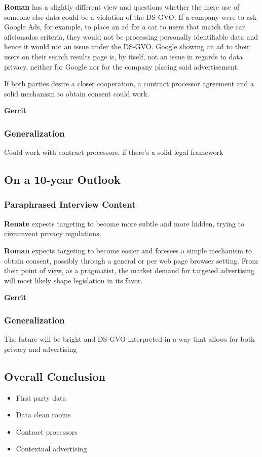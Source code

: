 \textbf{Roman} has a slightly different view and questions whether the mere use of someone else data could be a violation of the DS-GVO. If a company were to ask Google Ads, for example, to place an ad for a car to users that match the car aficionados criteria, they would not be processing personally identifiable data and hence it would not an issue under the DS-GVO. Google showing an ad to their users on their search results page is, by itself, not an issue in regards to data privacy, neither for Google nor for the company placing said advertisement.

If both parties desire a closer cooperation, a contract processor agreement and a solid mechanism to obtain consent could work.

\textbf{Gerrit} 

\subsubsection{Generalization}

Could work with contract processors, if there's a solid legal framework

\subsection{On a 10-year Outlook}

\subsubsection{Paraphrased Interview Content}

\textbf{Renate} expects targeting to become more subtle and more hidden, trying to circumvent privacy regulations.

\textbf{Roman} expects targeting to become easier and foresees a simple mechanism to obtain consent, possibly through a general or per web page browser setting. From their point of view, as a pragmatist, the market demand for targeted advertising will most likely shape legislation in its favor.

\textbf{Gerrit} 

\subsubsection{Generalization}

The future will be bright and DS-GVO interpreted in a way that allows for both privacy and advertising

\subsection{Overall Conclusion}

\begin{itemize}
 \item First party data 
 \item Data clean rooms
 \item Contract processors
 \item Contextual advertising
\end{itemize}
